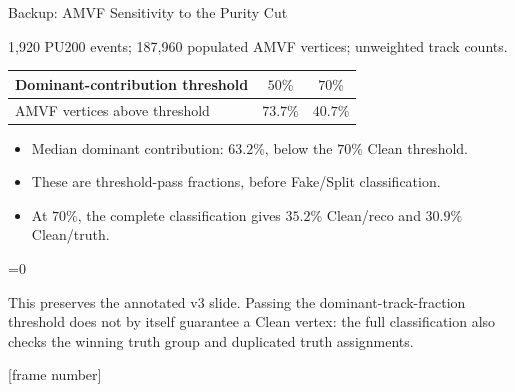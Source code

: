\documentclass[xcolor=table,aspectratio=169]{beamer}
\newcommand{\backupend}{
    \setcounter{framenumber}{\value{finalframe}}
    \setbeamertemplate{footline}[frame number]
}
\providecommand{\talkbuild}{0}
\newcommand{\readingonly}[1]{\ifnum\talkbuild=0\relax#1\fi}
\newcommand{\readingnote}[1]{\readingonly{\par\vspace{.35em}%
  {\footnotesize\color{black!65}#1\par}}}
\newcommand{\context}[1]{{\centering\footnotesize\color{black!55}#1\par}\vspace{.65em}}
\begin{document}
\begin{frame}{Backup: AMVF Sensitivity to the Purity Cut}
\context{1,920 PU200 events; 187,960 populated AMVF vertices; unweighted track counts.}
{\centering\small
\begin{tabular}{lcc}\toprule
Dominant-contribution threshold & $50\%$ & $70\%$\\\midrule
AMVF vertices above threshold & $73.7\%$ & $40.7\%$\\\bottomrule
\end{tabular}\par}
\par\vspace{1.2em}
\begin{itemize}\setlength\itemsep{1em}\small
\item Median dominant contribution: $63.2\%$, below the $70\%$ Clean threshold.
\item These are threshold-pass fractions, before Fake/Split classification.
\item At $70\%$, the complete classification gives $35.2\%$ Clean/reco and $30.9\%$ Clean/truth.
\end{itemize}
\readingnote{This preserves the annotated v3 slide. Passing the dominant-track-fraction threshold does not by itself guarantee a Clean vertex: the full classification also checks the winning truth group and duplicated truth assignments.}
\end{frame}

\backupend
\end{document}
